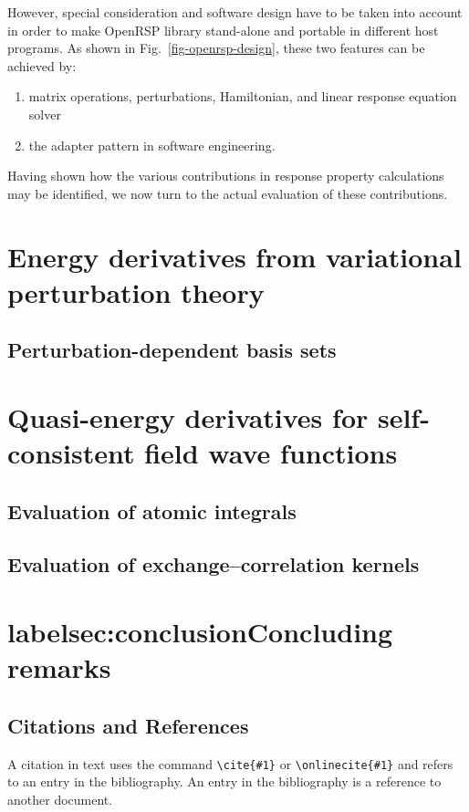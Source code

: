\documentclass[%
 reprint,
 amsmath,amssymb,
 aps,
]{revtex4-1}
\begin{document}
However, special consideration and software design have to be taken into
account in order to make OpenRSP library stand-alone and portable in different
host programs. As shown in Fig.~\ref{fig-openrsp-design}, these two features
can be achieved by:
\begin{enumerate}
  \item matrix operations, perturbations, Hamiltonian, and linear response equation solver
  \item the adapter pattern in software engineering.
\end{enumerate}

Having shown how the various contributions in response property calculations may be identified, we now turn to the actual evaluation of these contributions.

\section{\label{sec:VPT}Energy derivatives from variational perturbation theory}

\subsection{\label{sec:PDBS}Perturbation-dependent basis sets}

\section{\label{sec:QE-derivatives}Quasi-energy derivatives for self-consistent field wave functions}

\subsection{\label{sec:integrals}Evaluation of atomic integrals}

\subsection{\label{sec:XCkernels}Evaluation of exchange--correlation kernels}

\section{label{sec:conclusion}Concluding remarks}


\subsection{\label{sec:citeref}Citations and References}
A citation in text uses the command \verb+\cite{#1}+ or
\verb+\onlinecite{#1}+ and refers to an entry in the bibliography. 
An entry in the bibliography is a reference to another document.
\end{document}
